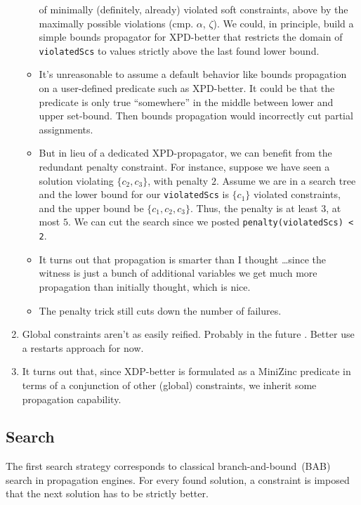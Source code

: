 \begin{enumerate}
\begin{itemize}
of minimally (definitely, already) violated soft constraints, above by the maximally possible violations (cmp. $\alpha$, $\zeta$).
We could, in principle, build a simple bounds propagator for XPD-better that restricts the domain of  \texttt{violatedScs}
to values strictly above the last found lower bound.
\item It's unreasonable to assume a default behavior like bounds propagation on a user-defined predicate such as XPD-better.
It could be that the predicate is only true ``somewhere'' in the middle between lower and upper set-bound. Then bounds propagation
would incorrectly cut partial assignments.
\item But in lieu of a dedicated XPD-propagator, we can benefit from the redundant penalty constraint. For instance, suppose 
we have seen a solution violating $\{c_2,c_3\}$, with penalty $2$. Assume we are in a search tree and the lower bound for our \texttt{violatedScs}
is $\{c_1\}$ violated constraints, and the upper bound be $\{c_1,c_2,c_3\}$. Thus, the penalty is at least $3$, at most $5$. We can cut the
search since we posted \texttt{penalty(violatedScs) < 2}.
\item It turns out that propagation is smarter than I thought \ldots since the witness is just a bunch of additional variables we get much more
propagation than initially thought, which is nice.
\item The penalty trick still cuts down the number of failures.
\end{itemize}
\item Global constraints aren't as easily reified. Probably in the future . Better use a restarts approach for now.
\item It turns out that, since XDP-better is formulated as a MiniZinc predicate in terms of a conjunction of other (global) constraints, we inherit some propagation capability.
\end{enumerate}

\subsection{Search}

The first search strategy corresponds to classical branch-and-bound~(BAB) search
in propagation engines. For every found solution, a constraint is imposed that 
the next solution has to be strictly better.

